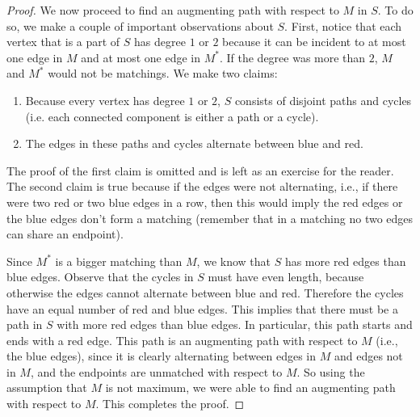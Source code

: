 \begin{flex}
\begin{proof}
We now proceed to find an augmenting path with respect to $M$ in $S$. To do so, we make a couple of important observations about $S$. First, notice that each vertex that is a part of $S$ has degree $1$ or $2$ because it can be incident to at most one edge in $M$ and at most one edge in $M^*$. If the degree was more than $2$, $M$ and $M^*$ would not be matchings. We make two claims:
\begin{enumerate}
    \item Because every vertex has degree $1$ or $2$, $S$ consists of disjoint paths and cycles (i.e. each connected component is either a path or a cycle).
    \item The edges in these paths and cycles alternate between blue and red.
\end{enumerate} 
The proof of the first claim is omitted and is left as an exercise for the reader. The second claim is true because if the edges were not alternating, i.e., if there were two red or two blue edges in a row, then this would imply the red edges or the blue edges don't form a matching (remember that in a matching no two edges can share an endpoint).

Since $M^*$ is a bigger matching than $M$, we know that $S$ has more red edges than blue edges. Observe that the cycles in $S$ must have even length, because otherwise the edges cannot alternate between blue and red. Therefore the cycles have an equal number of red and blue edges. This implies that there must be a path in $S$ with more red edges than blue edges. In particular, this path starts and ends with a red edge. This path is an augmenting path with respect to $M$ (i.e., the blue edges), since it is clearly alternating between edges in $M$ and edges not in $M$, and the endpoints are unmatched with respect to $M$. So using the assumption that $M$ is not maximum, we were able to find an augmenting path with respect to $M$. This completes the proof.

\end{proof}
\end{flex}

